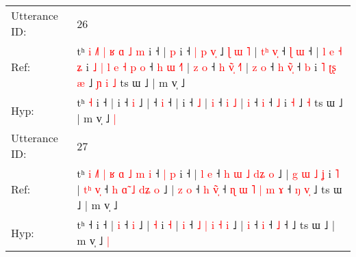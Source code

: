 \documentclass[10pt]{article}
\DeclareRobustCommand{\hl}[1]{{\textcolor{red}{#1}}}
\begin{document}
\begin{longtable}{ll}
 \\
\midrule
Utterance ID: & 26 \\
Ref: & tʰ\hl{ }\hl{i}\hl{ }\hl{˩}\hl{˥}\hl{ }\hl{|}\hl{ }\hl{ʁ}\hl{ }\hl{ɑ}\hl{ }\hl{˩} \hl{m} i ˧ |\hl{ }\hl{p} i ˧\hl{ }\hl{|}\hl{ }\hl{p} \hl{v}\hl{̩} ˩\hl{ }\hl{ɭ}\hl{ }\hl{ɯ}\hl{ }\hl{˥} |\hl{ }\hl{t}\hl{ʰ}\hl{ }\hl{v}\hl{̩} ˧\hl{ }\hl{ɭ} \hl{ɯ} ˧ |\hl{ }\hl{l}\hl{ }\hl{e}\hl{ }\hl{˧}\hl{ }\hl{ʑ} i\hl{ }\hl{˩}\hl{ }\hl{|}\hl{ }\hl{l}\hl{ }\hl{e}\hl{ }\hl{˧}\hl{ }\hl{p}\hl{ }\hl{o} ˧\hl{ }\hl{h}\hl{ }\hl{ɯ} \hl{˧}\hl{˥} |\hl{ }\hl{z} \hl{o} ˧\hl{ }\hl{h} \hl{v}\hl{̃}\hl{̩} \hl{˧}\hl{˥} |\hl{ }\hl{z} \hl{o} ˧\hl{ }\hl{h} \hl{v}\hl{̃}\hl{̩} ˧ \hl{b} i\hl{ }\hl{˥}\hl{ }\hl{ʈ}\hl{ʂ} \hl{æ} ˩\hl{ }\hl{ɲ}\hl{ }\hl{i} \hl{˩} ts ɯ ˩ | m v̩ ˩\hl{}\hl{}
 \\
Hyp: & tʰ\hl{}\hl{}\hl{}\hl{}\hl{}\hl{}\hl{}\hl{}\hl{}\hl{}\hl{}\hl{}\hl{} \hl{˧} i ˧ |\hl{}\hl{} i ˧\hl{}\hl{}\hl{}\hl{} \hl{}\hl{i} ˩\hl{}\hl{}\hl{}\hl{}\hl{}\hl{} |\hl{}\hl{}\hl{}\hl{}\hl{}\hl{} ˧\hl{}\hl{} \hl{i} ˧ |\hl{}\hl{}\hl{}\hl{}\hl{}\hl{}\hl{}\hl{} i\hl{}\hl{}\hl{}\hl{}\hl{}\hl{}\hl{}\hl{}\hl{}\hl{}\hl{}\hl{}\hl{}\hl{} ˧\hl{}\hl{}\hl{}\hl{} \hl{}\hl{˩} |\hl{}\hl{} \hl{i} ˧\hl{}\hl{} \hl{}\hl{}\hl{i} \hl{}\hl{˩} |\hl{}\hl{} \hl{i} ˧\hl{}\hl{} \hl{}\hl{}\hl{i} ˧ \hl{˩} i\hl{}\hl{}\hl{}\hl{}\hl{} \hl{˧} ˩\hl{}\hl{}\hl{}\hl{} \hl{˧} ts ɯ ˩ | m v̩ ˩\hl{ }\hl{|}
 \\
\midrule
Utterance ID: & 27 \\
Ref: & tʰ\hl{ }\hl{i}\hl{ }\hl{˩}\hl{˥}\hl{ }\hl{|}\hl{ }\hl{ʁ}\hl{ }\hl{ɑ}\hl{ }\hl{˩}\hl{ }\hl{m}\hl{ }\hl{i} ˧\hl{ }\hl{|}\hl{ }\hl{p} i ˧ |\hl{ }\hl{l} \hl{e} ˧\hl{ }\hl{h}\hl{ }\hl{ɯ}\hl{ }\hl{˩}\hl{ }\hl{d}\hl{ʑ} \hl{o} ˩ |\hl{ }\hl{g}\hl{ }\hl{ɯ}\hl{ }\hl{˩} \hl{ʝ} i \hl{˥} |\hl{ }\hl{t}\hl{ʰ} \hl{v}\hl{̩} ˧ \hl{h} \hl{ɑ}\hl{̃} \hl{˩} \hl{d}\hl{ʑ} \hl{o} ˩ |\hl{ }\hl{z} \hl{o} ˧\hl{ }\hl{h} \hl{v}\hl{̃}\hl{̩} ˧\hl{ }\hl{ɳ}\hl{ }\hl{ɯ}\hl{ }\hl{˥}\hl{ }\hl{|}\hl{ }\hl{m} \hl{ɤ} ˧\hl{ }\hl{ŋ}\hl{ }\hl{v}\hl{̩} ˩ ts ɯ ˩ | m v̩ ˩\hl{}\hl{}
 \\
Hyp: & tʰ\hl{}\hl{}\hl{}\hl{}\hl{}\hl{}\hl{}\hl{}\hl{}\hl{}\hl{}\hl{}\hl{}\hl{}\hl{}\hl{}\hl{} ˧\hl{}\hl{}\hl{}\hl{} i ˧ |\hl{}\hl{} \hl{i} ˧\hl{}\hl{}\hl{}\hl{}\hl{}\hl{}\hl{}\hl{}\hl{} \hl{i} ˩ |\hl{}\hl{}\hl{}\hl{}\hl{}\hl{} \hl{˧} i \hl{˧} |\hl{}\hl{}\hl{} \hl{}\hl{i} ˧ \hl{˩} \hl{}\hl{|} \hl{i} \hl{}\hl{˧} \hl{i} ˩ |\hl{}\hl{} \hl{i} ˧\hl{}\hl{} \hl{}\hl{}\hl{i} ˧\hl{}\hl{}\hl{}\hl{}\hl{}\hl{}\hl{}\hl{}\hl{}\hl{} \hl{˩} ˧\hl{}\hl{}\hl{}\hl{}\hl{} ˩ ts ɯ ˩ | m v̩ ˩\hl{ }\hl{|}
 \\

\end{longtable}
\end{document}
